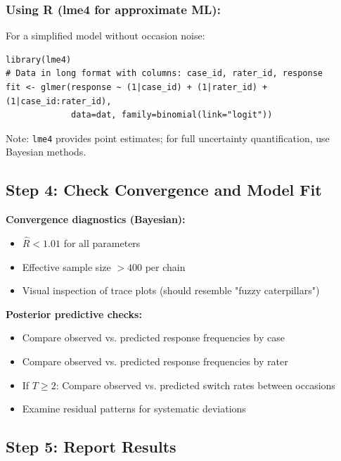 \documentclass[num-refs]{wiley-article}
\begin{document}
\subsubsection*{Using R (lme4 for approximate ML):}
For a simplified model without occasion noise:
\begin{verbatim}
library(lme4)
# Data in long format with columns: case_id, rater_id, response
fit <- glmer(response ~ (1|case_id) + (1|rater_id) + (1|case_id:rater_id),
             data=dat, family=binomial(link="logit"))
\end{verbatim}

Note: \texttt{lme4} provides point estimates; for full uncertainty quantification, use Bayesian methods.

\subsection*{Step 4: Check Convergence and Model Fit}

\textbf{Convergence diagnostics (Bayesian):}
\begin{itemize}
    \item $\hat{R} < 1.01$ for all parameters
    \item Effective sample size $> 400$ per chain
    \item Visual inspection of trace plots (should resemble "fuzzy caterpillars")
\end{itemize}

\textbf{Posterior predictive checks:}
\begin{itemize}
    \item Compare observed vs. predicted response frequencies by case
    \item Compare observed vs. predicted response frequencies by rater
    \item If $T \geq 2$: Compare observed vs. predicted switch rates between occasions
    \item Examine residual patterns for systematic deviations
\end{itemize}

\subsection*{Step 5: Report Results}
\end{document}
